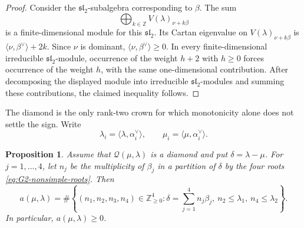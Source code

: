 \documentclass[11pt]{article}
\newtheorem{proposition}[proposition]{Proposition}
\theoremstyle{definition}
\theoremstyle{remark}
\newcommand{\QO}{\mathscr{Q}}
\begin{document}
\begin{proof}
Consider the $\mathfrak{sl}_2$-subalgebra corresponding to $\beta$.  The sum
\[
   \bigoplus_{k\in\mathbb Z}V(\lambda)_{\nu+k\beta}
\]
is a finite-dimensional module for this $\mathfrak{sl}_2$.  Its Cartan
eigenvalue on $V(\lambda)_{\nu+k\beta}$ is
$\langle\nu,\beta^\vee\rangle+2k$.  Since $\nu$ is dominant,
$\langle\nu,\beta^\vee\rangle\ge0$.  In every finite-dimensional irreducible
$\mathfrak{sl}_2$-module, occurrence of the weight $h+2$ with $h\ge0$ forces
occurrence of the weight $h$, with the same one-dimensional contribution.
After decomposing the displayed module into irreducible
$\mathfrak{sl}_2$-modules and summing these contributions, the claimed
inequality follows.
\end{proof}

The diamond is the only rank-two crown for which monotonicity alone does not
settle the sign.  Write
\[
   \lambda_i=\langle\lambda,\alpha_i^\vee\rangle,
   \qquad
   \mu_i=\langle\mu,\alpha_i^\vee\rangle.
\]

\begin{proposition}\label{prop:G2-diamond}
Assume that $\QO(\mu,\lambda)$ is a diamond and put
$\delta=\lambda-\mu$.  For $j=1,\ldots,4$, let $n_j$ be the multiplicity of
$\beta_j$ in a partition of $\delta$ by the four roots
\eqref{eq:G2-nonsimple-roots}.  Then
\begin{equation}\label{eq:G2-atomic-count}
 a(\mu,\lambda)
 =\#\left\{
 (n_1,n_2,n_3,n_4)\in\mathbb Z_{\ge0}^4:
 \delta=\sum_{j=1}^4n_j\beta_j,
 \ n_2\le\lambda_1,\ n_4\le\lambda_2
 \right\}.
\end{equation}
In particular, $a(\mu,\lambda)\ge0$.
\end{proposition}
\end{document}
